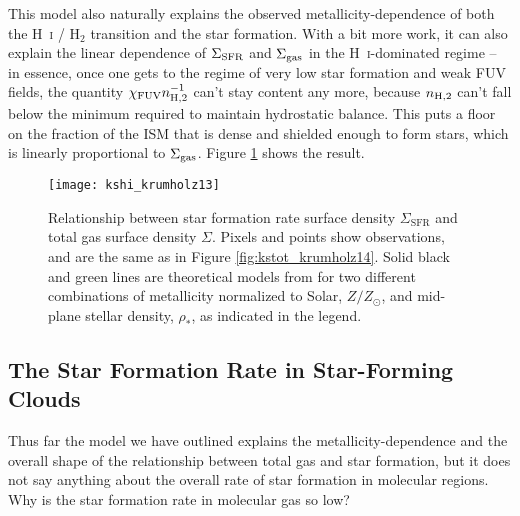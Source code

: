 This model also naturally explains the observed metallicity-dependence of both the H~\textsc{i} / H$_2$ transition and the star formation. With a bit more work, it can also explain the linear dependence of $\Sigma_{\rm SFR}$ and $\Sigma_{\rm gas}$ in the H~\textsc{i}-dominated regime -- in essence, once one gets to the regime of very low star formation and weak FUV fields, the quantity $\chi_{\rm FUV} n_{\rm H,2}^{-1}$ can't stay content any more, because $n_{\rm H,2}$ can't fall below the minimum required to maintain hydrostatic balance. This puts a floor on the fraction of the ISM that is dense and shielded enough to form stars, which is linearly proportional to $\Sigma_{\rm gas}$. Figure \ref{fig:kshi_krumholz13} shows the result.

\begin{figure}
\texttt{[image: kshi\_krumholz13]}
\caption[Theoretical model for metallicity-dependence of the star formation rate]{
\label{fig:kshi_krumholz13}
Relationship between star formation rate surface density $\Sigma_{\mathrm{SFR}}$ and total gas surface density $\Sigma$. Pixels and points show observations, and are the same as in Figure \ref{fig:kstot_krumholz14}. Solid black and green lines are theoretical models from \citet{krumholz13c} for two different combinations of metallicity normalized to Solar, $Z/Z_\odot$, and mid-plane stellar density, $\rho_*$, as indicated in the legend.
}
\end{figure}

\subsection{The Star Formation Rate in Star-Forming Clouds}

Thus far the model we have outlined explains the metallicity-dependence and the overall shape of the relationship between total gas and star formation, but it does not say anything about the overall rate of star formation in molecular regions. Why is the star formation rate in molecular gas so low?

